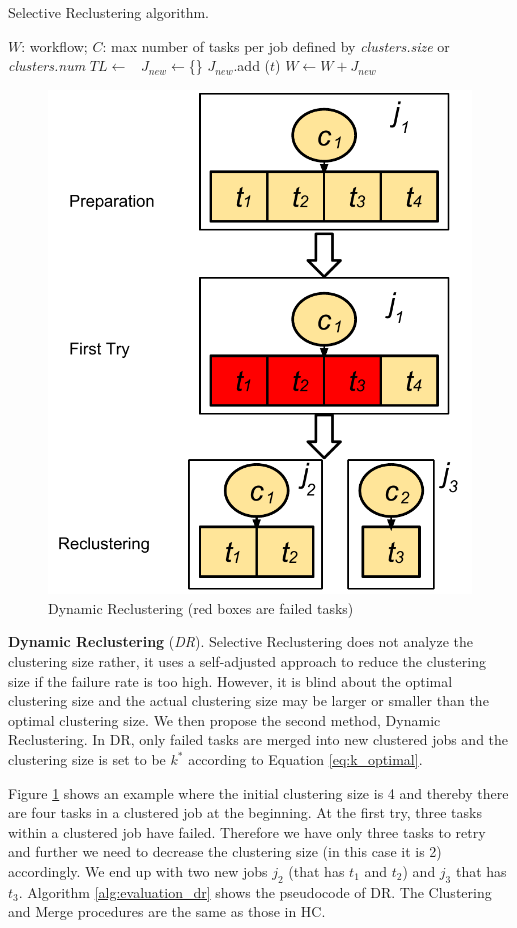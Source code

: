 \begin{algorithm}[!htb]
	\footnotesize
	\caption{Selective Reclustering algorithm. }
	\label{alg:evaluation_sr}
	\begin{algorithmic}[1]
		\Require $W$: workflow; $C$: max number of tasks per job defined by \emph{clusters.size} or \emph{clusters.num}
			\State $TL \gets$\ 
			\State $J_{new}\gets$\{\}
					\State $J_{new}$.add ($t$)
				\EndIf
			\EndFor
			\State $W \gets W + J_{new}$ 
		\EndProcedure
	\end{algorithmic}
\end{algorithm}

 

\begin{figure}[!htb]
\centering
  \includegraphics[width=0.4\linewidth]{figures/tolerance/dr.pdf}
  \caption{Dynamic Reclustering (red boxes are failed tasks)}
  \label{fig:clustering_dr}
\end{figure}

\textbf{Dynamic Reclustering} (\emph{DR}). 
Selective Reclustering does not analyze the clustering size rather, it uses a self-adjusted approach to reduce the clustering size if the failure rate is too high. However, it is blind about the optimal clustering size and the actual clustering size may be larger or smaller than the optimal clustering size. We then propose the second method, Dynamic Reclustering. In DR, only failed tasks are merged into new clustered jobs and the clustering size is set to be $k^*$ according to Equation \ref{eq:k_optimal}.



Figure \ref{fig:clustering_dr} shows an example where the initial clustering size is 4 and thereby there are four tasks in a clustered job at the beginning. At the first try, three tasks within a clustered job have failed. Therefore we have only three tasks to retry and further we need to decrease the clustering size (in this case it is 2) accordingly. We end up with two new jobs $j_2$ (that has $t_1$ and $t_2$) and $j_3$ that has $t_3$. Algorithm \ref{alg:evaluation_dr} shows the pseudocode of DR. The Clustering and Merge procedures are the same as those in HC. 

